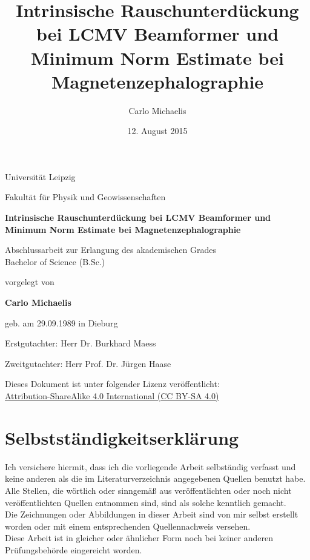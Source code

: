 \documentclass[doc,a4paper,12pt]{apa6}
\title{Intrinsische Rauschunterdückung bei LCMV Beamformer und Minimum Norm Estimate bei Magnetenzephalographie}
\author{Carlo Michaelis}
\date{12. August 2015}
\begin{document}

\thispagestyle{empty}

\begin{spacing}{1.1}
\begin{center}

\Large Universität Leipzig

\setlength{\parskip}{0.8em}
\normalsize Fakultät für Physik und Geowissenschaften

\setlength{\parskip}{6em}
\LARGE \textbf{Intrinsische Rauschunterdückung bei LCMV Beamformer und Minimum Norm Estimate bei Magnetenzephalographie}

\setlength{\parskip}{1.8em}
\normalsize Abschlussarbeit zur Erlangung des akademischen Grades\\ Bachelor of Science (B.Sc.)

\setlength{\parskip}{1.2em}
\normalsize vorgelegt von

\setlength{\parskip}{1.8em}
\Large \textbf{Carlo Michaelis}

\setlength{\parskip}{0.5em}
\normalsize geb. am 29.09.1989 in Dieburg

\setlength{\parskip}{3em}

Erstgutachter: Herr Dr. Burkhard Maess

\setlength{\parskip}{0.3em}
Zweitgutachter: Herr Prof. Dr. Jürgen Haase

\vfill

Dieses Dokument ist unter folgender Lizenz veröffentlicht:\\ \href{http://creativecommons.org/licenses/by-sa/4.0/}{Attribution-ShareAlike 4.0 International (CC BY-SA 4.0)}

\end{center}
\end{spacing}
\newpage

\section*{Selbstständigkeitserklärung}

Ich versichere hiermit, dass ich die vorliegende Arbeit selbständig verfasst und keine
anderen als die im Literaturverzeichnis angegebenen Quellen benutzt habe.\\
Alle Stellen, die wörtlich oder sinngemäß aus veröffentlichten oder noch nicht veröffentlichten
Quellen entnommen sind, sind als solche kenntlich gemacht.\\
Die Zeichnungen oder Abbildungen in dieser Arbeit sind von mir selbst erstellt worden oder
mit einem entsprechenden Quellennachweis versehen.\\
Diese Arbeit ist in gleicher oder ähnlicher Form noch bei keiner anderen Prüfungsbehörde
eingereicht worden.
\end{document}
